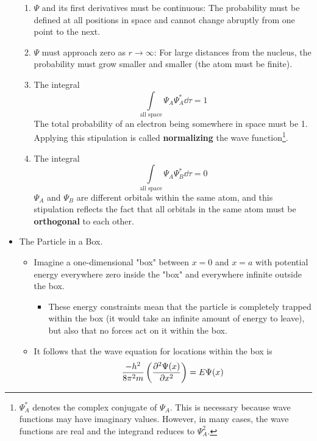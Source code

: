 \documentclass[../notes.tex]{subfiles}
\begin{document}
\begin{itemize}
\begin{enumerate}
        \item $\Psi$ and its first derivatives must be continuous: The probability must be defined at all positions in space and cannot change abruptly from one point to the next.
        \item $\Psi$ must approach zero as $r\to\infty$: For large distances from the nucleus, the probability must grow smaller and smaller (the atom must be finite).
        \item The integral
        \begin{equation*}
            \int\limits_\text{all space}\Psi_A\Psi_A^*\dd{\tau} = 1
        \end{equation*}
        The total probability of an electron being somewhere in space must be 1. Applying this stipulation is called \textbf{normalizing} the wave function\footnote{$\Psi_A^*$ denotes the complex conjugate of $\Psi_A$. This is necessary because wave functions may have imaginary values. However, in many cases, the wave functions are real and the integrand reduces to $\Psi_A^2$.}.
        \item The integral
        \begin{equation*}
            \int\limits_\text{all space}\Psi_A\Psi_B^*\dd{\tau} = 0
        \end{equation*}
        $\Psi_A$ and $\Psi_B$ are different orbitals within the same atom, and this stipulation reflects the fact that all orbitals in the same atom must be \textbf{orthogonal} to each other.
    \end{enumerate}
    \item {}The Particle in a Box.
    \begin{itemize}
        \item Imagine a one-dimensional "box" between $x=0$ and $x=a$ with potential energy everywhere zero inside the "box" and everywhere infinite outside the box.
        \begin{itemize}
            \item These energy constraints mean that the particle is completely trapped within the box (it would take an infinite amount of energy to leave), but also that no forces act on it within the box.
        \end{itemize}
        \item It follows that the wave equation for locations within the box is
        \begin{equation*}
            \frac{-h^2}{8\pi^2m}\left( \pdv[2]{\Psi(x)}{x} \right) = E\Psi(x)
        \end{equation*}

\end{itemize}
\end{itemize}
\end{document}
